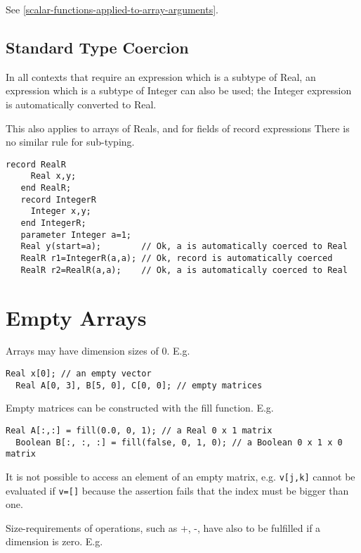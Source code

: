 See \autoref{scalar-functions-applied-to-array-arguments}.

\subsection{Standard Type Coercion}
In all contexts that require an expression which is a subtype of Real,
an expression which is a subtype of Integer can also be used; the
Integer expression is automatically converted to Real.

This also applies to arrays of Reals, and for fields of record expressions
There is no similar rule for sub-typing.

\begin{example}
\begin{lstlisting}[language=modelica]
   record RealR
     Real x,y;
   end RealR;
   record IntegerR
     Integer x,y;
   end IntegerR;
   parameter Integer a=1;
   Real y(start=a);        // Ok, a is automatically coerced to Real
   RealR r1=IntegerR(a,a); // Ok, record is automatically coerced
   RealR r2=RealR(a,a);    // Ok, a is automatically coerced to Real
\end{lstlisting}
\end{example}

\section{Empty Arrays}

Arrays may have dimension sizes of 0. E.g.

\begin{lstlisting}[language=modelica]
  Real x[0]; // an empty vector
  Real A[0, 3], B[5, 0], C[0, 0]; // empty matrices
\end{lstlisting}
Empty matrices can be constructed with the fill function. E.g.

\begin{lstlisting}[language=modelica]
  Real A[:,:] = fill(0.0, 0, 1); // a Real 0 x 1 matrix
  Boolean B[:, :, :] = fill(false, 0, 1, 0); // a Boolean 0 x 1 x 0 matrix
\end{lstlisting}
It is not possible to access an element of an empty matrix, e.g.
  \lstinline!v[j,k]! cannot be evaluated if \lstinline!v=[]! because the assertion fails
that the index must be bigger than one.

Size-requirements of operations, such as +, -, have also to be fulfilled
if a dimension is zero. E.g.

